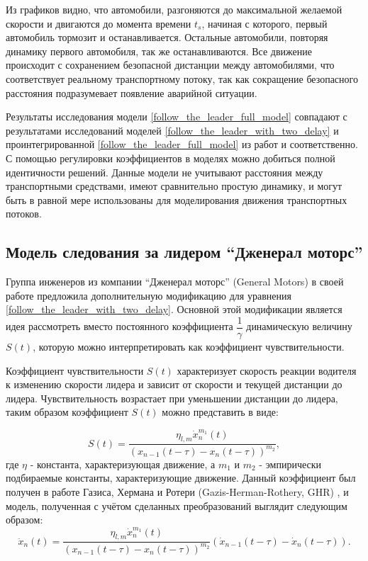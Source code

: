 \documentclass[12pt, a4paper]{extarticle}
\numberwithin{equation}{section}
\begin{document}
Из графиков видно, что автомобили, разгоняются до максимальной желаемой скорости и двигаются до момента времени $t_s$, начиная с которого, первый автомобиль тормозит и останавливается. Остальные автомобили, повторяя динамику первого автомобиля, так же останавливаются. Все движение происходит с сохранением безопасной дистанции между автомобилями, что соответствует реальному транспортному потоку, так как сокращение безопасного расстояния подразумевает появление аварийной ситуации.

Результаты исследования модели \eqref{follow_the_leader_full_model} совпадают с  результатами исследований моделей \eqref{follow_the_leader_with_two_delay} и проинтегрированной \eqref{follow_the_leader_full_model} из работ \cite{RefineFirstFollowTheLeaderModel} и \cite{Course} соответственно. С помощью регулировки коэффициентов в моделях можно добиться полной идентичности решений. Данные модели не учитывают расстояния между транспортными средствами, имеют сравнительно простую динамику, и могут быть в равной мере использованы для моделирования движения транспортных потоков. 

\subsection{Модель следования за лидером ``Дженерал моторс''}

Группа инженеров из компании ``Дженерал моторс'' (General Motors) в своей работе \cite{GazisModel} предложила дополнительную модификацию для уравнения  \eqref{follow_the_leader_with_two_delay}. Основной этой модификации является идея рассмотреть вместо постоянного коэффициента $\dfrac{1}{\gamma}$ динамическую величину $S(t)$, которую можно интерпретировать как коэффициент чувствительности. 

Коэффициент чувствительности $S(t)$ характеризует скорость реакции водителя к изменению скорости лидера и зависит от скорости и текущей дистанции до лидера. Чувствительность возрастает при уменьшении дистанции до лидера, таким образом коэффициент $S(t)$ можно представить в виде:

\begin{equation} \label{gazis_coefficient}
S(t) = \dfrac{\eta_{l,m}\dot{x}_n^{m_1}(t)}{(x_{n-1}(t-\tau)-x_n(t-\tau))^{m_2}},
\end{equation}
где $\eta$ - константа, характеризующая движение, а $m_1$ и $m_2$ - эмпирически подбираемые константы, характеризующие движение. Данный коэффициент был получен в работе Газиса, Хермана и Ротери (Gazis-Herman-Rothery, GHR)  \cite{GazisModel}, и модель, полученная с учётом сделанных преобразований выглядит следующим образом:   
\begin{equation} \label{gazis_model}
\ddot{x}_n(t) = \dfrac{\eta_{l,m}\dot{x}_n^{m_1}(t)}{(x_{n-1}(t-\tau)-x_n(t-\tau))^{m_2}} (\dot{x}_{n-1}(t-\tau) - \dot{x}_{n}(t-\tau)).
\end{equation}
\end{document}
